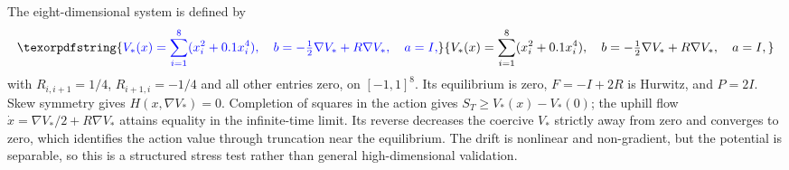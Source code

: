 \documentclass[11pt]{article}
\theoremstyle{plain}      %
\theoremstyle{definition} %
\providecommand{\DIFaddtex}[1]{{\protect\color{blue}#1}} %
\providecommand{\DIFadd}[1]{\texorpdfstring{\DIFaddtex{#1}}{#1}} %
\begin{document}
\DIFadd{The eight-dimensional system is defined by
}\begin{equation}\DIFadd{\label{eq:appendix-eight}
 V_*(x)=\sum_{i=1}^8(x_i^2+0.1x_i^4),\quad
 b=-\tfrac12\nabla V_*+R\nabla V_*,\quad a=I,
}\end{equation}
\DIFadd{with $R_{i,i+1}=1/4$, $R_{i+1,i}=-1/4$ and all other entries zero, on $[-1,1]^8$. Its equilibrium is zero, $F=-I+2R$ is Hurwitz, and $P=2I$. Skew symmetry gives $H(x,\nabla V_*)=0$. Completion of squares in the action gives $S_T\geq V_*(x)-V_*(0)$; the uphill flow $\dot x=\nabla V_*/2+R\nabla V_*$ attains equality in the infinite-time limit. Its reverse decreases the coercive $V_*$ strictly away from zero and converges to zero, which identifies the action value through truncation near the equilibrium. The drift is nonlinear and non-gradient, but the potential is separable, so this is a structured stress test rather than general high-dimensional validation.
}
\end{document}
